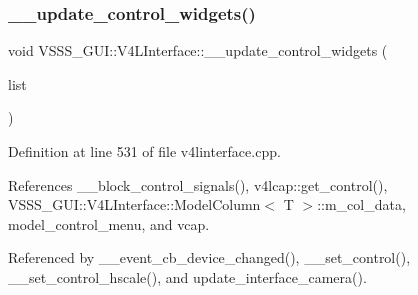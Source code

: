 \subsubsection{\texorpdfstring{\+\_\+\+\_\+update\+\_\+control\+\_\+widgets()}{\_\_update\_control\_widgets()}}
{\footnotesize\ttfamily void V\+S\+S\+S\+\_\+\+G\+U\+I\+::\+V4\+L\+Interface\+::\+\_\+\+\_\+update\+\_\+control\+\_\+widgets (\begin{DoxyParamCaption}\item[{std\+::list$<$ \hyperlink{namespace_v_s_s_s___g_u_i_a9eff2f5504f050458ee4bcf362482a8d}{Control\+Holder} $>$ \&}]{list }\end{DoxyParamCaption})\hspace{0.3cm}{\ttfamily [private]}}



Definition at line 531 of file v4linterface.\+cpp.



References \+\_\+\+\_\+block\+\_\+control\+\_\+signals(), v4lcap\+::get\+\_\+control(), V\+S\+S\+S\+\_\+\+G\+U\+I\+::\+V4\+L\+Interface\+::\+Model\+Column$<$ T $>$\+::m\+\_\+col\+\_\+data, model\+\_\+control\+\_\+menu, and vcap.



Referenced by \+\_\+\+\_\+event\+\_\+cb\+\_\+device\+\_\+changed(), \+\_\+\+\_\+set\+\_\+control(), \+\_\+\+\_\+set\+\_\+control\+\_\+hscale(), and update\+\_\+interface\+\_\+camera().


